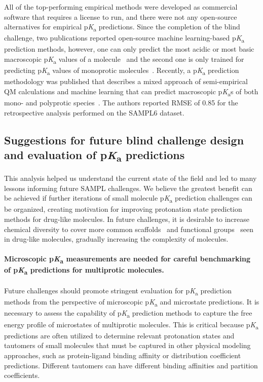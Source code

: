 \documentclass[9pt,lineno,final]{elife}
\newcommand{\pKa}{p\textit{K}\textsubscript{a}}
\begin{document}
All of the top-performing empirical methods were developed as commercial software that requires a license to run, and there were not any open-source alternatives for empirical \pKa{} predictions. 
Since the completion of the blind challenge, two publications reported open-source machine learning-based \pKa{} prediction methods, however, one can only predict the most acidic or most basic macroscopic \pKa{} values of a molecule~\citep{Mansouri:2019:J.Cheminformatics} and the second one is only trained for predicting \pKa{} values of monoprotic molecules~\citep{Baltruschat:2020:F1000Research}. 
Recently, a \pKa{} prediction methodology was published that describes a mixed approach of semi-empirical QM calculations and machine learning that can predict macroscopic \pKa{}s of both mono- and polyprotic species~\citep{Hunt:2020:J.Chem.Inf.Model.}. 
The authors reported RMSE of 0.85 for the retrospective analysis performed on the SAMPL6 dataset.



\subsection{Suggestions for future blind challenge design and evaluation of \pKa{} predictions}

This analysis helped us understand the current state of the field and led to many lessons informing future SAMPL challenges. 
We believe the greatest benefit can be achieved if further iterations of small molecule \pKa{} prediction challenges can be organized, creating motivation for improving protonation state prediction methods for drug-like molecules. 
In future challenges, it is desirable to increase chemical diversity to cover more common scaffolds~\citep{Zdrazil:2018:J.Med.Chem.} and functional groups~\citep{Ertl:2020:J.Med.Chem.} seen in drug-like molecules, gradually increasing the complexity of molecules.

\paragraph{Microscopic \pKa{} measurements are needed for careful benchmarking of \pKa{} predictions for multiprotic molecules.}
Future challenges should promote stringent evaluation for \pKa{} prediction methods from the perspective of microscopic \pKa{} and microstate predictions.
It is necessary to assess the capability of \pKa{} prediction methods to capture the free energy profile of microstates of multiprotic molecules. 
This is critical because \pKa{} predictions are often utilized to determine relevant protonation states and tautomers of small molecules that must be captured in other physical modeling approaches, such as protein-ligand binding affinity or distribution coefficient predictions. 
Different tautomers can have different binding affinities and partition coefficients.
\end{document}
